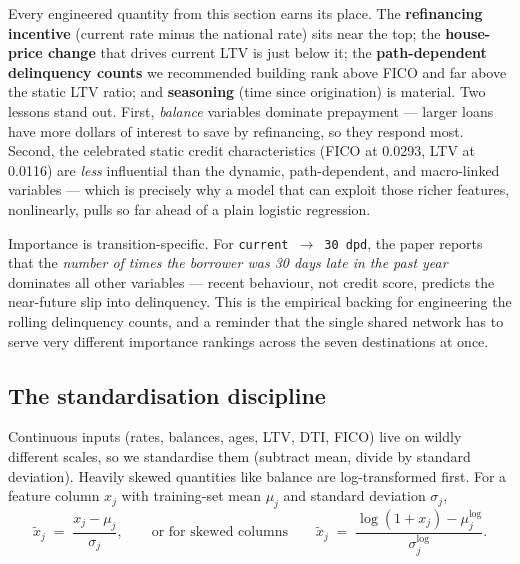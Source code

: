 \documentclass[11pt]{article}
\newcommand{\state}[1]{\texttt{#1}}
\begin{document}
\begin{intuition}
Every engineered quantity from this section earns its place. The \textbf{refinancing
incentive} (current rate minus the national rate) sits near the top; the \textbf{house-price
change} that drives current LTV is just below it; the \textbf{path-dependent delinquency
counts} we recommended building rank above FICO and far above the static LTV ratio; and
\textbf{seasoning} (time since origination) is material. Two lessons stand out. First,
\emph{balance} variables dominate prepayment --- larger loans have more dollars of interest to
save by refinancing, so they respond most. Second, the celebrated static credit
characteristics (FICO at 0.0293, LTV at 0.0116) are \emph{less} influential than the dynamic,
path-dependent, and macro-linked variables --- which is precisely why a model that can exploit
those richer features, nonlinearly, pulls so far ahead of a plain logistic regression.
\end{intuition}

\begin{intuition}
Importance is transition-specific. For \state{current}~$\to$~\state{30 dpd}, the paper reports
that the \emph{number of times the borrower was 30 days late in the past year} dominates all
other variables --- recent behaviour, not credit score, predicts the near-future slip into
delinquency. This is the empirical backing for engineering the rolling delinquency counts, and
a reminder that the single shared network has to serve very different importance rankings across
the seven destinations at once.
\end{intuition}

\subsection{The standardisation discipline}

Continuous inputs (rates, balances, ages, LTV, DTI, FICO) live on wildly different scales,
so we standardise them (subtract mean, divide by standard deviation). Heavily skewed
quantities like balance are log-transformed first. For a feature column $x_j$ with
training-set mean $\mu_j$ and standard deviation $\sigma_j$,
\begin{equation}
  \tilde{x}_j \;=\; \frac{x_j - \mu_j}{\sigma_j},
  \qquad\text{or for skewed columns}\qquad
  \tilde{x}_j \;=\; \frac{\log(1+x_j) - \mu_j^{\log}}{\sigma_j^{\log}} .
  \label{eq:standardize}
\end{equation}
\end{document}
